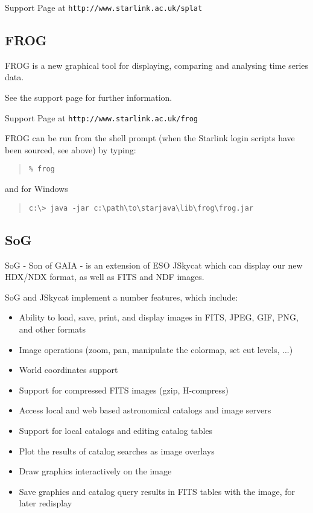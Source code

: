 \documentclass[twoside,11pt]{article}
\newcommand{\htmladdnormallink}[2]{#1}
\newcommand{\latex}[1]{#1}
\newcommand{\xlabel}[1]{}
\renewcommand{\_}{\texttt{\symbol{95}}}
\begin{document}
Support Page at 
\htmladdnormallink{\texttt{http://www.starlink.ac.uk/splat}}{http://www.starlink.ac.uk/splat}


\subsection{\label{frog}\xlabel{frog}FROG}
FROG is a new graphical tool for displaying, comparing and 
analysing time series data.

See the support page for further information.

Support Page at 
\htmladdnormallink{\texttt{http://www.starlink.ac.uk/frog}}{http://www.starlink.ac.uk/frog}

FROG can be run from the shell prompt (when the Starlink login scripts have 
been sourced, see above) by typing:

\begin{quote}
\begin{verbatim}
% frog
\end{verbatim}
\end{quote}

and for Windows

\begin{quote}
\begin{verbatim}
c:\> java -jar c:\path\to\starjava\lib\frog\frog.jar
\end{verbatim}
\end{quote}

\subsection{\label{sog}\xlabel{sog}SoG}
SoG - Son of GAIA - is an extension of ESO JSkycat which can display our 
new HDX/NDX format, as well as FITS and NDF images.

SoG and JSkycat implement a number features, which include:

\begin{itemize}
 \item Ability to load, save, print, and display images in FITS, JPEG, GIF, PNG, 
       and other formats
 \item Image operations (zoom, pan, manipulate the colormap, set cut levels, ...)
 \item World coordinates support
 \item Support for compressed FITS images (gzip, H-compress)
 \item Access local and web based astronomical catalogs and image servers
 \item Support for local catalogs and editing catalog tables
 \item Plot the results of catalog searches as image overlays
 \item Draw graphics interactively on the image
 \item Save graphics and catalog query results in FITS tables with the image, 
       for later redisplay
\end{itemize}
\end{document}
